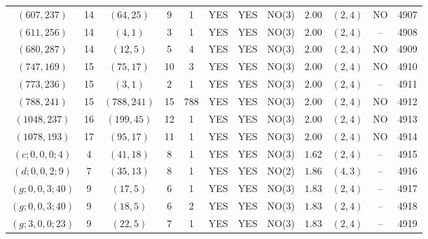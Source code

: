 \begin{longtable}{|c|c|c|c|c|c|c|c|c|c|c|c|}
$(607,237)$ & 14 & $(64,25)$ & 9 & 1 & YES & YES & NO(3) & $2.00$ & $(2,4)$ & NO & 4907\\
$(611,256)$ & 14 & $(4,1)$ & 3 & 1 & YES & YES & NO(3) & $2.00$ & $(2,4)$ & -- & 4908\\
$(680,287)$ & 14 & $(12,5)$ & 5 & 4 & YES & YES & NO(3) & $2.00$ & $(2,4)$ & NO & 4909\\
$(747,169)$ & 15 & $(75,17)$ & 10 & 3 & YES & YES & NO(3) & $2.00$ & $(2,4)$ & NO & 4910\\
$(773,236)$ & 15 & $(3,1)$ & 2 & 1 & YES & YES & NO(3) & $2.00$ & $(2,4)$ & -- & 4911\\
$(788,241)$ & 15 & $(788,241)$ & 15 & 788 & YES & YES & NO(3) & $2.00$ & $(2,4)$ & NO & 4912\\
$(1048,237)$ & 16 & $(199,45)$ & 12 & 1 & YES & YES & NO(3) & $2.00$ & $(2,4)$ & NO & 4913\\
$(1078,193)$ & 17 & $(95,17)$ & 11 & 1 & YES & YES & NO(3) & $2.00$ & $(2,4)$ & NO & 4914\\
$(c;0,0,0;4)$ & 4 & $(41,18)$ & 8 & 1 & YES & YES & NO(3) & $1.62$ & $(2,4)$ & -- & 4915\\
$(d;0,0,2;9)$ & 7 & $(35,13)$ & 8 & 1 & YES & YES & NO(2) & $1.86$ & $(4,3)$ & -- & 4916\\
$(g;0,0,3;40)$ & 9 & $(17,5)$ & 6 & 1 & YES & YES & NO(3) & $1.83$ & $(2,4)$ & -- & 4917\\
$(g;0,0,3;40)$ & 9 & $(18,5)$ & 6 & 2 & YES & YES & NO(3) & $1.83$ & $(2,4)$ & -- & 4918\\
$(g;3,0,0;23)$ & 9 & $(22,5)$ & 7 & 1 & YES & YES & NO(3) & $1.83$ & $(2,4)$ & -- & 4919
\end{longtable}
